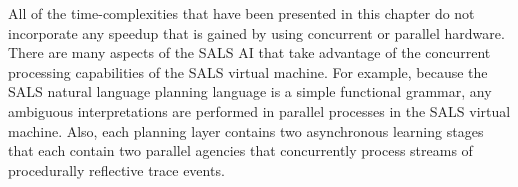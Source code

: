 All of the time-complexities that have been presented in this chapter
do not incorporate any speedup that is gained by using concurrent or
parallel hardware.  There are many aspects of the SALS AI that take
advantage of the concurrent processing capabilities of the SALS
virtual machine.  For example, because the SALS natural language
planning language is a simple functional grammar, any ambiguous
interpretations are performed in parallel processes in the SALS
virtual machine.  Also, each planning layer contains two asynchronous
learning stages that each contain two parallel agencies that
concurrently process streams of procedurally reflective trace events.




